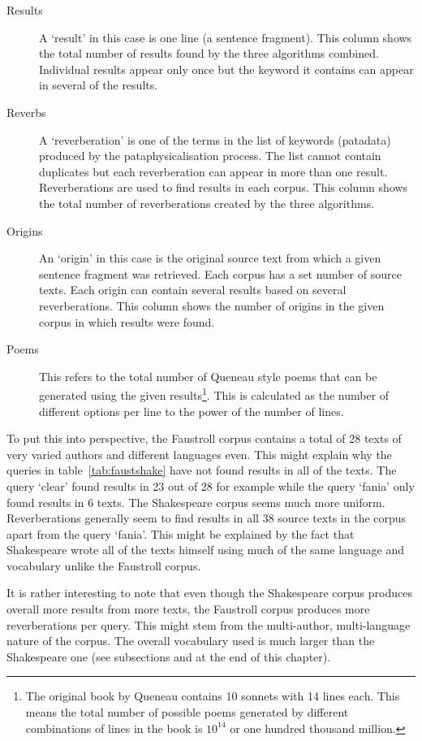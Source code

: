 \begin{description}
  \item[Results] A `result' in this case is one line (a sentence fragment). This column shows the total number of results found by the three algorithms combined. Individual results appear only once but the keyword it contains can appear in several of the results.
  \item[Reverbs] A `reverberation' is one of the terms in the list of keywords (patadata) produced by the pataphysicalisation process. The list cannot contain duplicates but each reverberation can appear in more than one result. Reverberations are used to find results in each corpus. This column shows the total number of reverberations created by the three algorithms.
  \item[Origins] An `origin' in this case is the original source text from which a given sentence fragment was retrieved. Each corpus has a set number of source texts. Each origin can contain several results based on several reverberations. This column shows the number of origins in the given corpus in which results were found.
  \item[Poems] This refers to the total number of Queneau style poems that can be generated using the given results\footnote{The original book by Queneau contains 10 sonnets with 14 lines each. This means the total number of possible poems generated by different combinations of lines in the book is $10^{14}$ or one hundred thousand million.}. This is calculated as the number of different options per line to the power of the number of lines.
\end{description}

To put this into perspective, the Faustroll corpus contains a total of \num{28} texts of very varied authors and different languages even. This might explain why the queries in table~\ref{tab:faustshake} have not found results in all of the texts. The query `clear' found results in \num{23} out of \num{28} for example while the query `fania' only found results in \num{6} texts. The Shakespeare corpus seems much more uniform. Reverberations generally seem to find results in all \num{38} source texts in the corpus apart from the query `fania'. This might be explained by the fact that Shakespeare wrote all of the texts himself using much of the same language and vocabulary unlike the Faustroll corpus. 

It is rather interesting to note that even though the Shakespeare corpus produces overall more results from more texts, the Faustroll corpus produces more reverberations per query. This might stem from the multi-author, multi-language nature of the corpus. The overall vocabulary used is much larger than the Shakespeare one (see subsections  and  at the end of this chapter).

